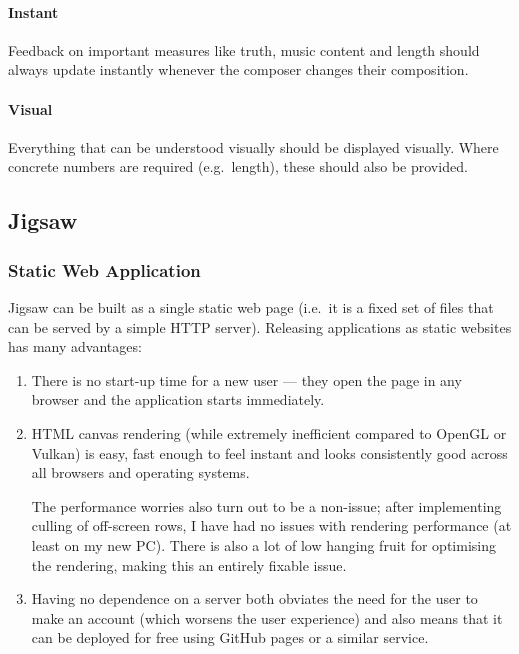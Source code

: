 \documentclass[12pt]{article}
\begin{document}
\paragraph{Instant} Feedback on important measures like truth, music content and length should
always update instantly whenever the composer changes their composition.

\paragraph{Visual} Everything that can be understood visually should be displayed visually.  Where
concrete numbers are required (e.g.\ length), these should also be provided.

\subsection{Jigsaw}

\subsubsection{Static Web Application}

Jigsaw can be built as a single static web page (i.e.\ it is a fixed set of files that can be served
by a simple HTTP server).  Releasing applications as static websites has many advantages:

\begin{enumerate}
    \item There is no start-up time for a new user --- they open the page in any browser and the
        application starts immediately.
    \item HTML canvas rendering (while extremely inefficient compared to OpenGL or Vulkan) is easy,
        fast enough to feel instant and looks consistently good across all browsers and operating
        systems.

        The performance worries also turn out to be a non-issue; after implementing culling of
        off-screen rows, I have had no issues with rendering performance (at least on my new PC).
        There is also a lot of low hanging fruit for optimising the rendering, making this an
        entirely fixable issue.
    \item Having no dependence on a server both obviates the need for the user to make an account
        (which worsens the user experience) and also means that it can be deployed for free using
        GitHub pages or a similar service.
\end{enumerate}
\end{document}
